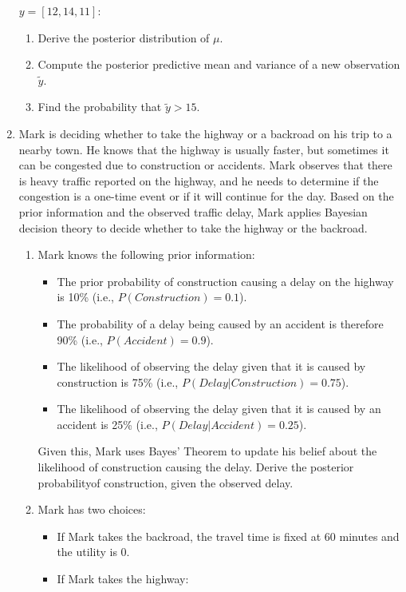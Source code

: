 \documentclass[12pt,a4paper,twoside]{article}
\begin{document}
\begin{enumerate}
    $y = [12, 14, 11]$:
    \begin{enumerate}[label=\alph*)]
        \item Derive the posterior distribution of $\mu$.
        \item Compute the posterior predictive mean and variance of a new observation $\tilde{y}$.
        \item Find the probability that $\tilde{y} > 15$.
    \end{enumerate}
    \item Mark is deciding whether to take the highway or a backroad on his trip to a nearby town.
    He knows that the highway is usually faster, but sometimes it can be congested due to construction
    or accidents. Mark observes that there is heavy traffic reported on the highway, and he needs to
    determine if the congestion is a one-time event or if it will continue for the day. Based on the
    prior information and the observed traffic delay, Mark applies Bayesian decision theory to decide
    whether to take the highway or the backroad.
    \begin{enumerate}[label=\alph*)]
    \item Mark knows the following prior information:
    \begin{itemize}
        \item The prior probability of construction causing a delay on the highway is 10\%
        (i.e., $P(Construction) = 0.1$).
        \item  The probability of a delay being caused by an accident is therefore 90\%
        (i.e., $P(Accident) = 0.9$).
        \item The likelihood of observing the delay given that it is caused by construction
        is 75\% (i.e., $P(Delay | Construction) = 0.75$).
        \item The likelihood of observing the delay given that it is caused by an accident
        is 25\% (i.e., $P(Delay | Accident) = 0.25$).
    \end{itemize}
    Given this, Mark uses Bayes’ Theorem to update his belief about the likelihood of
    construction causing the delay. Derive the posterior probabilityof construction, given
    the observed delay.
    \item Mark has two choices:
    \begin{itemize}
        \item If Mark takes the backroad, the travel time is fixed at 60 minutes and the utility
        is 0.
        \item If Mark takes the highway:

\end{itemize}
\end{enumerate}
\end{enumerate}
\end{document}
